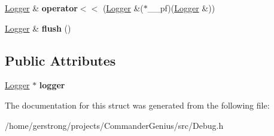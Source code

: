 \begin{DoxyCompactItemize}
\item 
\hypertarget{struct_logger_1_1_locked_stream_wrapper_aac11d721828b4dea225e05217cbb2a8e}{
\hyperlink{struct_logger}{Logger} \& {\bfseries operator$<$$<$} (\hyperlink{struct_logger}{Logger} \&($\ast$\_\-\_\-pf)(\hyperlink{struct_logger}{Logger} \&))}
\label{struct_logger_1_1_locked_stream_wrapper_aac11d721828b4dea225e05217cbb2a8e}

\item 
\hypertarget{struct_logger_1_1_locked_stream_wrapper_ae1d2c4264bba28cb2ff1c33165cc9526}{
\hyperlink{struct_logger}{Logger} \& {\bfseries flush} ()}
\label{struct_logger_1_1_locked_stream_wrapper_ae1d2c4264bba28cb2ff1c33165cc9526}

\end{DoxyCompactItemize}
\subsection*{Public Attributes}
\begin{DoxyCompactItemize}
\item 
\hypertarget{struct_logger_1_1_locked_stream_wrapper_af4f253224c85cd2c4636fbd9acf36d92}{
\hyperlink{struct_logger}{Logger} $\ast$ {\bfseries logger}}
\label{struct_logger_1_1_locked_stream_wrapper_af4f253224c85cd2c4636fbd9acf36d92}

\end{DoxyCompactItemize}


The documentation for this struct was generated from the following file:\begin{DoxyCompactItemize}
\item 
/home/gerstrong/projects/CommanderGenius/src/Debug.h\end{DoxyCompactItemize}
